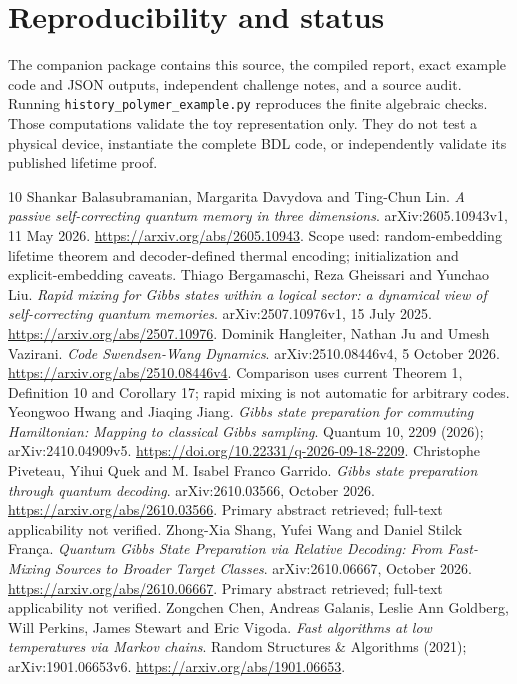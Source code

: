 \documentclass[11pt,a4paper]{article}
\begin{document}
\section*{Reproducibility and status}

The companion package contains this source, the compiled report, exact example code and JSON outputs, independent challenge notes, and a source audit. Running \texttt{history\_polymer\_example.py} reproduces the finite algebraic checks. Those computations validate the toy representation only. They do not test a physical device, instantiate the complete BDL code, or independently validate its published lifetime proof.

\begin{thebibliography}{10}\small
{} Shankar Balasubramanian, Margarita Davydova and Ting-Chun Lin. \emph{A passive self-correcting quantum memory in three dimensions}. arXiv:2605.10943v1, 11 May 2026. \url{https://arxiv.org/abs/2605.10943}. Scope used: random-embedding lifetime theorem and decoder-defined thermal encoding; initialization and explicit-embedding caveats.
 Thiago Bergamaschi, Reza Gheissari and Yunchao Liu. \emph{Rapid mixing for Gibbs states within a logical sector: a dynamical view of self-correcting quantum memories}. arXiv:2507.10976v1, 15 July 2025. \url{https://arxiv.org/abs/2507.10976}.
 Dominik Hangleiter, Nathan Ju and Umesh Vazirani. \emph{Code Swendsen-Wang Dynamics}. arXiv:2510.08446v4, 5 October 2026. \url{https://arxiv.org/abs/2510.08446v4}. Comparison uses current Theorem 1, Definition 10 and Corollary 17; rapid mixing is not automatic for arbitrary codes.
 Yeongwoo Hwang and Jiaqing Jiang. \emph{Gibbs state preparation for commuting Hamiltonian: Mapping to classical Gibbs sampling}. Quantum 10, 2209 (2026); arXiv:2410.04909v5. \url{https://doi.org/10.22331/q-2026-09-18-2209}.
 Christophe Piveteau, Yihui Quek and M. Isabel Franco Garrido. \emph{Gibbs state preparation through quantum decoding}. arXiv:2610.03566, October 2026. \url{https://arxiv.org/abs/2610.03566}. Primary abstract retrieved; full-text applicability not verified.
 Zhong-Xia Shang, Yufei Wang and Daniel Stilck Fran\c ca. \emph{Quantum Gibbs State Preparation via Relative Decoding: From Fast-Mixing Sources to Broader Target Classes}. arXiv:2610.06667, October 2026. \url{https://arxiv.org/abs/2610.06667}. Primary abstract retrieved; full-text applicability not verified.
 Zongchen Chen, Andreas Galanis, Leslie Ann Goldberg, Will Perkins, James Stewart and Eric Vigoda. \emph{Fast algorithms at low temperatures via Markov chains}. Random Structures \& Algorithms (2021); arXiv:1901.06653v6. \url{https://arxiv.org/abs/1901.06653}.

\end{thebibliography}
\end{document}
